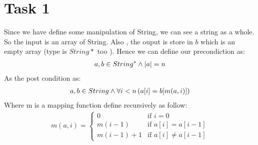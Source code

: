 \documentclass[a4paper,12pt,fleqn]{scrartcl}
\newcommand{\length}[1]{\left|#1\right|}
\begin{document}
\section{Task 1}
Since we have define some manipulation of String, we can see a 
string as a whole. So the input is an array of String. Also ,
the ouput is store in $b$ which is an empty array (type is $String*$ too 
). Hence we can define our precondiction as:
\begin{gather*}
    a,b\in String^*\And\length{a} = n
\end{gather*}
As the post condition as:
\begin{gather*}
    a,b\in String \wedge\forall i < n\left(a[i] = b[m(a,i)]\right)
\end{gather*}
Where m is a mapping function define recursively as follow:
\begin{gather*}
    m(a,i) = 
    \begin{cases}
        0         & \text{if } i=0\\
        m(i-1)    & \text{if } a[i] = a[i-1]\\
        m(i-1) +1 & \text{if } a[i] \neq a[i-1]
    \end{cases}
\end{gather*}
\end{document}
